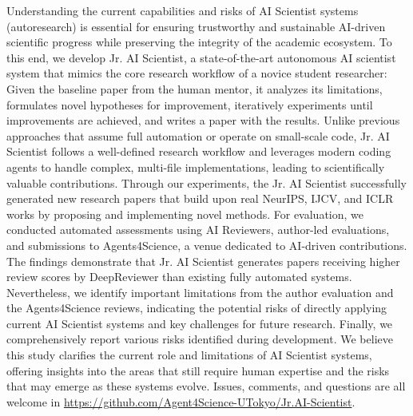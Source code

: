 Understanding the current capabilities and risks of AI Scientist systems (autoresearch) is essential for ensuring trustworthy and sustainable AI-driven scientific progress while preserving the integrity of the academic ecosystem. To this end, we develop Jr. AI Scientist, a state-of-the-art autonomous AI scientist system that mimics the core research workflow of a novice student researcher: Given the baseline paper from the human mentor, it analyzes its limitations, formulates novel hypotheses for improvement, iteratively experiments until improvements are achieved, and writes a paper with the results. Unlike previous approaches that assume full automation or operate on small-scale code, Jr. AI Scientist follows a well-defined research workflow and leverages modern coding agents to handle complex, multi-file implementations, leading to scientifically valuable contributions. Through our experiments, the Jr. AI Scientist successfully generated new research papers that build upon real NeurIPS, IJCV, and ICLR works by proposing and implementing novel methods. For evaluation, we conducted automated assessments using AI Reviewers, author-led evaluations, and submissions to Agents4Science, a venue dedicated to AI-driven contributions. The findings demonstrate that Jr. AI Scientist generates papers receiving higher review scores by DeepReviewer than existing fully automated systems. Nevertheless, we identify important limitations from the author evaluation and the Agents4Science reviews, indicating the potential risks of directly applying current AI Scientist systems and key challenges for future research. Finally, we comprehensively report various risks identified during development. We believe this study clarifies the current role and limitations of AI Scientist systems, offering insights into the areas that still require human expertise and the risks that may emerge as these systems evolve. Issues, comments, and questions are all welcome in \url{https://github.com/Agent4Science-UTokyo/Jr.AI-Scientist}.